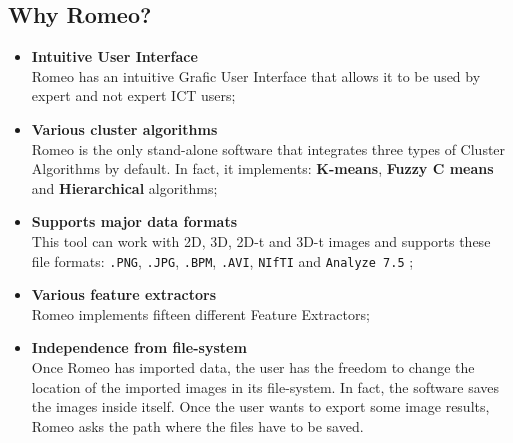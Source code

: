 \subsection{Why Romeo?}
\label{whyromeo}
\begin{itemize}
\item \textbf{Intuitive User Interface\\} Romeo has an intuitive Grafic User Interface that allows it to be used by expert and not expert ICT users;
\item \textbf{Various cluster algorithms\\} Romeo is the only stand-alone software that integrates three types of Cluster Algorithms by default. In fact, it implements: \textbf{K-means}, \textbf{Fuzzy C means} and \textbf{Hierarchical} algorithms;
\item \textbf{Supports major data formats\\} This tool can work with 2D, 3D, 2D-t and 3D-t images and supports these file formats: \verb!.PNG!, \verb!.JPG!, \verb!.BPM!, \verb!.AVI!, \verb!NIfTI! and \verb!Analyze 7.5! ;
\item \textbf{Various feature extractors\\} Romeo implements fifteen different Feature Extractors;
\item \textbf{Independence from file-system\\} Once Romeo has imported data, the user has the freedom to change the location of the imported images in its file-system. In fact, the software saves the images inside itself. Once the user wants to export some image results, Romeo asks the path where the files have to be saved.
\end{itemize}

